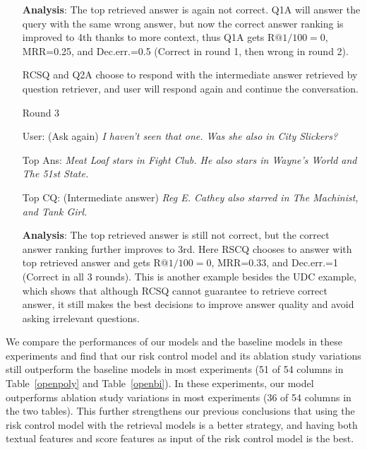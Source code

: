 \documentclass[format=acmsmall, review=False, screen=true]{acmart}
\begin{document}
\begin{itemize}
    \item[\textbf{Analysis}:]
    The top retrieved answer is again not correct. Q1A will answer the query with the same wrong answer, but now the correct answer ranking is improved to 4th thanks to more context, thus Q1A gets $\text{R@1/100}=0$, MRR=0.25, and Dec.err.=0.5 (Correct in round 1, then wrong in round 2). 
    
    RCSQ and Q2A choose to respond with the intermediate answer retrieved by question retriever, and user will respond again and continue the conversation.
    
    \item[Round 3]
    \item[User:] (Ask again) \textit{I haven't seen that one. Was she also in City Slickers?}
    
    \item[Top Ans:] \textit{Meat Loaf stars in Fight Club.  He also stars in Wayne's World and The 51st State.}
    
    \item[Top CQ:] (Intermediate answer)  \textit{Reg E. Cathey also starred in The Machinist, and Tank Girl.}
    
    \item[\textbf{Analysis}:]
    The top retrieved answer is still not correct, but the correct answer ranking further improves to 3rd. Here RSCQ chooses to answer with top retrieved answer and gets $\text{R@1/100}=0$, MRR=0.33, and Dec.err.=1 (Correct in all 3 rounds). This is another example besides the UDC example, which shows that although RCSQ cannot guarantee to retrieve correct answer, it still makes the best decisions to improve answer quality and avoid asking irrelevant questions.  
    
\end{itemize}

We compare the performances of our models and the baseline models in these experiments and find that our risk control model and its ablation study variations still outperform the baseline models in most experiments (51 of 54 columns in Table~\ref{openpoly} and Table~\ref{openbi}). In these experiments, our model outperforms ablation study variations in most experiments (36 of 54 columns in the two tables). This further strengthens our previous conclusions that using the risk control model with the retrieval models is a better strategy, and having both textual features and score features as input of the risk control model is the best.
\end{document}
